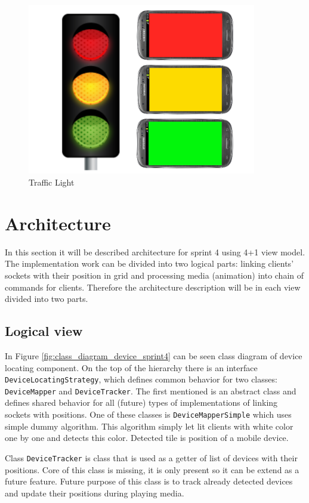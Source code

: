 \begin{figure}[h]
	\centering
		\includegraphics[width=10cm]{sprint4/trafficlight.png}
	\caption{Traffic Light}
	\label{fig:trafficlight}
\end{figure}

\section{Architecture}
In this section it will be described architecture for sprint 4 using 4+1 view model.
The implementation work can be divided into two logical parts: linking clients' sockets with their position in grid and processing media (animation) into chain of commands for clients.
Therefore the architecture description will be in each view divided into two parts.

\subsection{Logical view}
In Figure \ref{fig:class_diagram_device_sprint4} can be seen class diagram of device locating component.
On the top of the hierarchy there is an interface \texttt{DeviceLocatingStrategy}, which defines common behavior for two classes: \texttt{DeviceMapper} and \texttt{DeviceTracker}.
The first mentioned is an abstract class and defines shared behavior for all (future) types of implementations of linking sockets with positions.
One of these classes is \texttt{DeviceMapperSimple} which uses simple dummy algorithm.
This algorithm simply let lit clients with white color one by one and detects this color.
Detected tile is position of a mobile device.

Class \texttt{DeviceTracker} is class that is used as a getter of list of devices with their positions.
Core of this class is missing, it is only present so it can be extend as a future feature.
Future purpose of this class is to track already detected devices and update their positions during playing media.

